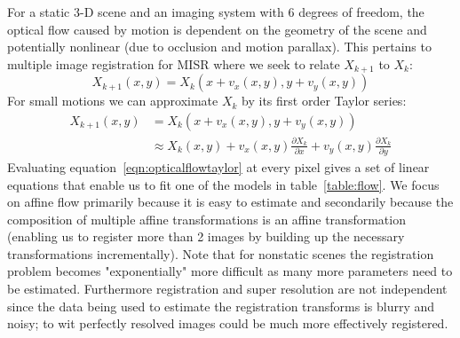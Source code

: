 For a static 3-D scene and an imaging system with 6 degrees of freedom, the optical flow caused by motion is dependent on the geometry of the scene and potentially nonlinear (due to occlusion and motion parallax).
%
This pertains to multiple image registration for MISR where we seek to relate $X_{k+1}$ to $X_k$:
\begin{equation*}
    X_{k+1}(x,y) = X_k(x + v_x(x,y), y + v_y(x,y))
\end{equation*}
%
For small motions we can approximate $X_k$ by its first order Taylor series:
\begin{align}
    X_{k+1}(x,y) &= X_k(x + v_x(x,y), y + v_y(x,y)) \\
    &\approx X_k(x,y) + v_x(x,y)\frac{\partial X_k}{\partial x} + v_y(x,y)\frac{\partial X_k}{\partial y}\label{eqn:opticalflowtaylor}
\end{align}
Evaluating equation~\ref{eqn:opticalflowtaylor} at every pixel gives a set of linear equations that enable us to fit one of the models in table~\ref{table:flow}.
%
We focus on affine flow primarily because it is easy to estimate and secondarily because the composition of multiple affine transformations is an affine transformation (enabling us to register more than 2 images by building up the necessary transformations incrementally).
%
Note that for nonstatic scenes the registration problem becomes "exponentially" more difficult as many more parameters need to be estimated.
%
Furthermore registration and super resolution are not independent since the data being used to estimate the registration transforms is blurry and noisy; to wit perfectly resolved images could be much more effectively registered.



